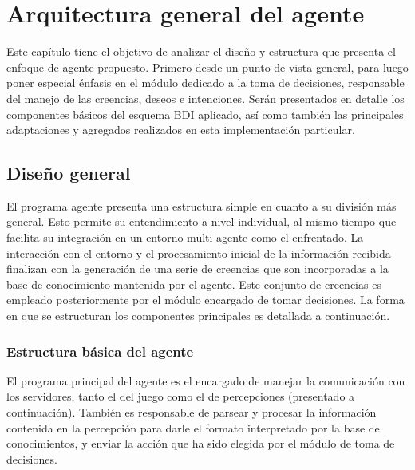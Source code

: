 \chapter{Arquitectura general del agente}
\label{chap:arquitectura}

Este capítulo tiene el objetivo de analizar el diseño y estructura que
presenta el enfoque de agente propuesto.
Primero desde un punto de vista general, para luego poner especial
énfasis en el módulo dedicado a la toma de decisiones, responsable
del manejo de las creencias, deseos e intenciones.
Serán presentados en detalle los componentes básicos del esquema BDI
aplicado, así como también las principales adaptaciones y agregados
realizados en esta implementación particular.

\section{Diseño general}
\label{sec:diseno_general}

El programa agente presenta una estructura simple en cuanto a su
división más general.
Esto permite su entendimiento a nivel individual, al mismo tiempo que
facilita su integración en un entorno multi-agente como el
enfrentado.
La interacción con el entorno y el procesamiento inicial de la
información recibida finalizan con la generación de una serie de
creencias que son incorporadas a la base de conocimiento mantenida por
el agente.
Este conjunto de creencias es empleado posteriormente por el módulo
encargado de tomar decisiones.
La forma en que se estructuran los componentes principales es
detallada a continuación.

\subsection{Estructura básica del agente}
\label{sec:estructura_basica_de_agente}

El programa principal del agente es el encargado de manejar la
comunicación con los servidores, tanto el del juego como el de
percepciones (presentado a continuación).
También es responsable de parsear y procesar la información contenida
en la percepción para darle el formato interpretado por la base de
conocimientos, y enviar la acción que ha sido elegida por el módulo
de toma de decisiones.

